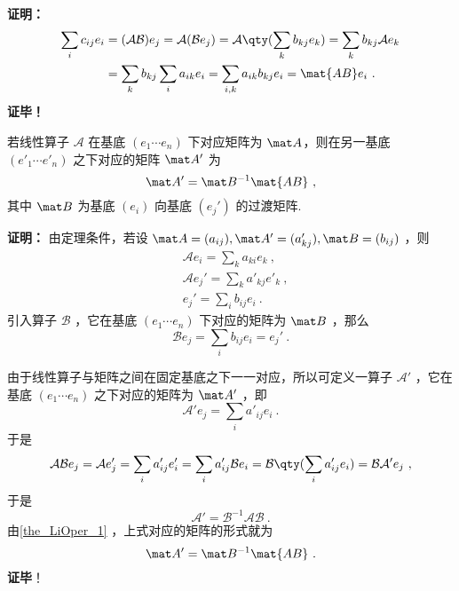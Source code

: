 \textbf{证明：}
\begin{equation}
\begin{aligned}
\sum_i c_{ij} e_i&=(\mathcal{AB}) e_j=\mathcal{A}(\mathcal{B} e_j)=\mathcal{A}\qty(\sum_k b_{kj} e_k)=\sum_k b_{kj}\mathcal{A} e_k\\
&=\sum_k b_{kj}\sum_i a_{ik} e_i=\sum_{i,k}a_{ik}b_{kj} e_i=\mat{AB} e_i~.
\end{aligned}
\end{equation}
\textbf{证毕！}

\begin{theorem}{}\label{the_LiOper_2}
若线性算子 $\mathcal A$ 在基底 $( e_1\cdots  e_n)$ 下对应矩阵为 $\mat A$，则在另一基底  $( e'_1\cdots  e'_n)$ 之下对应的矩阵 $\mat A'$ 为
\begin{equation}
\mat A'=\mat B^{-1}\mat{AB}~,
\end{equation}
其中 $\mat B$ 为基底 $( e_i)$ 向基底 $( e_j')$ 的过渡矩阵.
\end{theorem}

\textbf{证明：}
由定理条件，若设 $\mat A=(a_{ij}), \mat A'=(a_{kj}'),\mat B=(b_{ij})$ ，则
\begin{equation}
\begin{aligned}
&\mathcal{A} e_i=\sum_{k} a_{ki} e_k
~,\\
&\mathcal{A} e_j'=\sum_{k} a'_{kj} e'_k~,\\
& e_j'=\sum_i b_{ij} e_i~.
\end{aligned}
\end{equation}
引入算子 $\mathcal{B}$ ，它在基底 $( e_1\cdots  e_n)$ 下对应的矩阵为 $\mat B$ ，那么
\begin{equation}
\mathcal{B} e_j=\sum_i b_{ij} e_i= e_j'~.
\end{equation}

由于线性算子与矩阵之间在固定基底之下一一对应，所以可定义一算子 $\mathcal{A'}$ ，它在基底 $( e_1\cdots  e_n)$ 之下对应的矩阵为 $\mat A'$ ，即
\begin{equation}
\mathcal A' e_j=\sum_i a'_{ij} e_i~.
\end{equation}
于是
\begin{equation}
\mathcal{AB} e_j=\mathcal{A} e'_j=\sum_i a'_{ij}  e'_i=\sum_i a'_{ij}\mathcal{B} e_i=\mathcal{B}\qty(\sum_i a'_{ij} e_i)=\mathcal{BA'} e_j~,
\end{equation}
于是 
\begin{equation}
\mathcal{A'}=\mathcal{B}^{-1}\mathcal{AB}~.
\end{equation}
由\autoref{the_LiOper_1} ，上式对应的矩阵的形式就为
\begin{equation}
\mat A'=\mat B^{-1}\mat{AB}~.
\end{equation}
\textbf{证毕}！


